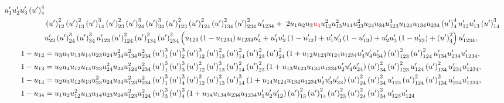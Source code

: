 \documentclass[hidelinks,12pt]{article}
\begin{document}
\begin{enumerate}
{{\begin{align*}
   u'_1 u'_2 u'_3 \left(u'\right)_4^4 \nonumber\\ &\left(u'\right)_{12}^2
   \left(u'\right)_{13}^2 \left(u'\right)_{14}^3
   \left(u'\right)_{23}^2 \left(u'\right)_{24}^3
   \left(u'\right)_{34}^3 \left(u'\right)_{123}^2
   \left(u'\right)_{124}^2 \left(u'\right)_{134}^2
   \left(u'\right)_{234}^2 u'_{1234}+~2 u_1 u_2 u_3 \textcolor{red}{u_4} u_{12}^2
   u_{13}^2 u_{14} u_{23}^2 u_{24} u_{34} u_{123}^3 u_{124}
   u_{134} u_{234} \left(u'\right)_4^4 u'_{12} u'_{13}
   \left(u'\right)_{14}^3 \nonumber\\ &u'_{23} \left(u'\right)_{24}^3
   \left(u'\right)_{34}^3 u'_{123} \left(u'\right)_{124}^2
   \left(u'\right)_{134}^2 \left(u'\right)_{234}^2 \left(u_{123}
   \left(1-u_{1234}\right) u_{1234} u'_4+u'_1 u'_2
   \left(1-u'_{12}\right)+u'_1 u'_3 \left(1-u'_{13}\right)+u'_2 u'_3
   \left(1-u'_{23}\right)+\left(u'\right)_4^2\right) u'_{1234},\nonumber \\
    1-u_{12}&= u_3 u_4
   u_{13} u_{14} u_{23} u_{24} u_{34}^2 u_{134}^2 u_{234}^2 \left(u'\right)_1^3
   \left(u'\right)_2^3 \left(u'\right)_{12}^3 \left(u'\right)_{13}^2
   \left(u'\right)_{14}^2 \left( u'\right)_{23}^2 \left(u'\right)_{24}^2 \left(1+u_{12}
   u_{123} u_{124} u_{1234} u'_3 u'_4 u'_{34}\right) \left(u'\right)_{123}^2
   \left(u'\right)_{124}^2 u'_{134} u'_{234} u'_{1234},\nonumber \\
     1-u_{13}&=u_2 u_4 u_{12}
   u_{14} u_{23} u_{24}^2 u_{34} u_{124}^2 u_{234}^2 \left(u'\right)_1^3
   \left(u'\right)_3^3 \left(u'\right)_{12}^2 \left(u'\right)_{13}^3
   \left(u'\right)_{14}^2 \left(u'\right)_{23}^2 \left(1+ u_{13} u_{123} u_{134} u_{1234}
   u'_2 u'_4 u'_{24}\right) \left(u'\right)_{34}^2 \left(u'\right)_{123}^2 u'_{124}
   \left(u'\right)_{134}^2 u'_{234} u'_{1234},\nonumber \\ 
   1-u_{14}&= u_2 u_3 u_{12} u_{13} u_{23}^2 u_{24} u_{34} u_{123}^2 u_{234}^2
   \left(u'\right)_1^3 \left(u'\right)_4^3 \left(u'\right)_{12}^2 \left(u'\right)_{13}^2
   \left(u'\right)_{14}^3 \left(1+ u_{14} u_{124} u_{134} u_{1234} u'_2 u'_3
   u'_{23}\right) \left(u'\right)_{24}^2 \left(u'\right)_{34}^2 u'_{123}
   \left(u'\right)_{124}^2 \left(u'\right)_{134}^2 u'_{234} u'_{1234}, \nonumber \\ 
    1-u_{34}&= u_1 u_2 u_{12}^2 u_{13}
   u_{14} u_{23} u_{24} u_{123}^2 u_{124}^2 \left(u'\right)_3^3 \left(u'\right)_4^3
   \left(1+u_{34} u_{134} u_{234} u_{1234} u'_1 u'_2 u'_{12}\right)
   \left(u'\right)_{13}^2 \left(u'\right)_{14}^2 \left(u'\right)_{23}^2
   \left(u'\right)_{24}^2 \left(u'\right)_{34}^3 u'_{123} u'_{124}

\end{align*}}}
\end{enumerate}
\end{document}
